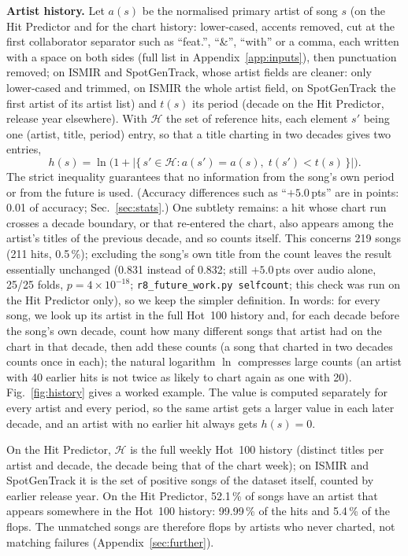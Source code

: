 \documentclass[conference]{IEEEtran}
\newcommand{\pp}{\,pts}
\begin{document}
\textbf{Artist history.} Let $a(s)$ be the normalised primary artist of song $s$ (on the Hit Predictor and for
the chart history: lower-cased, accents removed, cut at the first collaborator separator such as ``feat.'',
``\&'', ``with'' or a comma, each written with a space on both sides (full list in Appendix~\ref{app:inputs}), then punctuation removed; on ISMIR and
SpotGenTrack, whose artist fields are cleaner: only lower-cased and trimmed, on ISMIR the whole artist field, on
SpotGenTrack the first artist of its artist list) and $t(s)$ its period (decade on
the Hit Predictor, release year elsewhere). With $\mathcal{H}$ the set of reference hits, each element $s'$ being
one (artist, title, period) entry, so that a title charting in two decades gives two entries,
\begin{equation}
h(s) = \ln\bigl(1 + \bigl|\{\,s' \in \mathcal{H} : a(s') = a(s),\; t(s') < t(s)\,\}\bigr|\bigr).
\end{equation}
The strict inequality guarantees that no information from the song's own period or from
the future is used. (Accuracy differences such as ``$+5.0$\pp'' are in points: 0.01 of accuracy;
Sec.~\ref{sec:stats}.) One subtlety remains: a hit whose chart run crosses a decade boundary, or that re-entered the
chart, also appears among the artist's titles of the previous decade, and so counts itself. This concerns 219
songs (211 hits, 0.5\,\%); excluding the song's own title from the count leaves the result essentially unchanged (0.831
instead of 0.832; still $+5.0$\pp{} over audio alone, 25/25 folds, $p=4\times10^{-18}$; \texttt{r8\_future\_work.py selfcount}; this check
was run on the Hit Predictor only), so we keep the simpler definition. In words: for every song, we look up its artist in the full Hot~100
history and, for each decade before the song's own decade, count how many different songs that artist had on
the chart in that decade, then add these counts (a song that charted in two decades counts once in each); the natural logarithm $\ln$ compresses large counts (an artist with 40 earlier hits is
not twice as likely to chart again as one with 20). Fig.~\ref{fig:history} gives a worked
example. The value is computed separately for every artist and every period, so the same
artist gets a larger value in each later decade, and an artist with no earlier hit always gets
$h(s)=0$.

 On the Hit Predictor, $\mathcal{H}$ is the full weekly Hot~100 history
(distinct titles per artist and decade, the decade being that of the chart week); on ISMIR and
SpotGenTrack it is the set of positive songs of the dataset itself, counted by earlier release year. On the Hit
Predictor, 52.1\,\% of songs have an artist that appears somewhere in the Hot~100 history: 99.99\,\% of the hits
and 5.4\,\% of the flops. The unmatched songs are therefore flops by artists who never charted, not matching
failures (Appendix~\ref{sec:further}).
\end{document}
